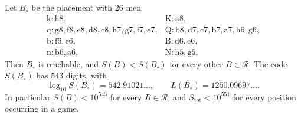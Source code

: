 \documentclass[12pt,reqno]{article}
\newcommand{\rea}{\mathcal{R}}
\newcommand{\sq}[1]{\mathrm{#1}}
\begin{document}
\begin{theorem}\label{thmreach}
Let $B_{\circ}$ be the placement with $26$ men
\begin{displaymath}
\begin{array}{ll}
\sq{k}\colon \sq{h8}, & \sq{K}\colon \sq{a8},\\
\sq{q}\colon \sq{g8},\sq{f8},\sq{e8},\sq{d8},\sq{c8},\sq{h7},\sq{g7},\sq{f7},\sq{e7}, &
\sq{Q}\colon \sq{b8},\sq{d7},\sq{c7},\sq{b7},\sq{a7},\sq{h6},\sq{g6},\\
\sq{b}\colon \sq{f6},\sq{e6}, & \sq{B}\colon \sq{d6},\sq{c6},\\
\sq{n}\colon \sq{b6},\sq{a6}, & \sq{N}\colon \sq{h5},\sq{g5} .
\end{array}
\end{displaymath}
Then $B_{\circ}$ is reachable, and $S(B)<S(B_{\circ})$ for every other $B\in\rea$. The code
$S(B_{\circ})$ has $543$ digits, with
\begin{displaymath}
\log_{10}S(B_{\circ})=542.91021\ldots,\qquad L(B_{\circ})=1250.09697\ldots .
\end{displaymath}
In particular $S(B)<10^{543}$ for every $B\in\rea$, and $S_{\mathrm{tot}}<10^{551}$ for every
position occurring in a game.
\end{theorem}
\end{document}
